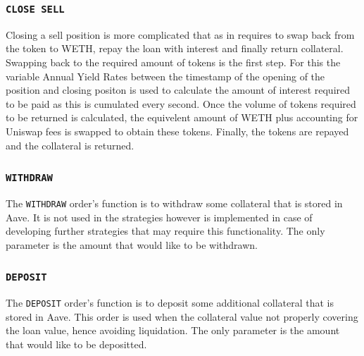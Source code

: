 \subsubsection{\texttt{CLOSE\ SELL}}
Closing a sell position is more complicated that as in requires to swap back from the token to WETH, repay the loan with interest and finally return collateral. Swapping back to the required amount of tokens is the first step. For this the variable Annual Yield Rates between the timestamp of the opening of the position and closing positon is used to calculate the amount of interest required to be paid as this is cumulated every second. Once the volume of tokens required to be returned is calculated, the equivelent amount of WETH plus accounting for Uniswap fees is swapped to obtain these tokens. Finally, the tokens are repayed and the collateral is returned.

\subsubsection{\texttt{WITHDRAW}}
The \texttt{WITHDRAW} order's function is to withdraw some collateral that is stored in Aave. It is not used in the strategies however is implemented in case of developing further strategies that may require this functionality. The only parameter is the amount that would like to be withdrawn.

\subsubsection{\texttt{DEPOSIT}}
The \texttt{DEPOSIT} order's function is to deposit some additional collateral that is stored in Aave. This order is used when the collateral value not properly covering the loan value, hence avoiding liquidation. The only parameter is the amount that would like to be depositted. 

